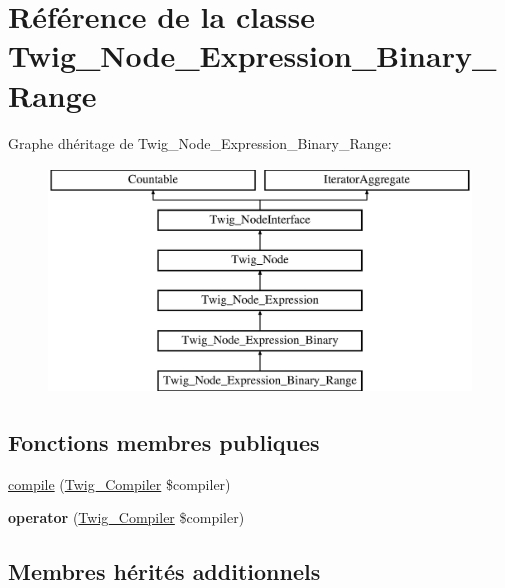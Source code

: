 \hypertarget{class_twig___node___expression___binary___range}{}\section{Référence de la classe Twig\+\_\+\+Node\+\_\+\+Expression\+\_\+\+Binary\+\_\+\+Range}
\label{class_twig___node___expression___binary___range}
Graphe d\textquotesingle{}héritage de Twig\+\_\+\+Node\+\_\+\+Expression\+\_\+\+Binary\+\_\+\+Range\+:\begin{figure}[H]
\begin{center}
\leavevmode
\includegraphics[height=6.000000cm]{class_twig___node___expression___binary___range}
\end{center}
\end{figure}
\subsection*{Fonctions membres publiques}
\begin{DoxyCompactItemize}
\item 
\hyperlink{class_twig___node___expression___binary___range_a4e0faa87c3fae583620b84d3607085da}{compile} (\hyperlink{class_twig___compiler}{Twig\+\_\+\+Compiler} \$compiler)
\item 
{\bfseries operator} (\hyperlink{class_twig___compiler}{Twig\+\_\+\+Compiler} \$compiler)\hypertarget{class_twig___node___expression___binary___range_af77318ec88d5f8a508684970a150b670}{}\label{class_twig___node___expression___binary___range_af77318ec88d5f8a508684970a150b670}

\end{DoxyCompactItemize}
\subsection*{Membres hérités additionnels}


